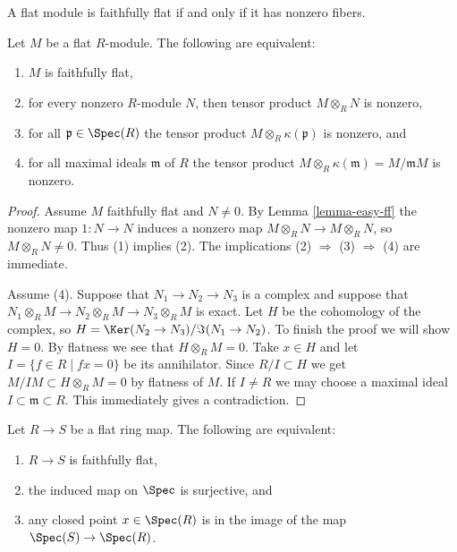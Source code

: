 \begin{lemma}
\label{lemma-ff}
\begin{slogan}
A flat module is faithfully flat if and only if it has nonzero fibers.
\end{slogan}
Let $M$ be a flat $R$-module.
The following are equivalent:
\begin{enumerate}
\item $M$ is faithfully flat,
\item for every nonzero $R$-module $N$, then tensor product $M \otimes_R N$
is nonzero,
\item for all $\mathfrak p \in \Spec(R)$
the tensor product $M \otimes_R \kappa(\mathfrak p)$ is nonzero, and
\item for all maximal ideals $\mathfrak m$ of $R$
the tensor product $M \otimes_R \kappa(\mathfrak m) = M/{\mathfrak m}M$
is nonzero.
\end{enumerate}
\end{lemma}

\begin{proof}
Assume $M$ faithfully flat and $N \not = 0$. By Lemma \ref{lemma-easy-ff}
the nonzero map $1 : N \to N$ induces a nonzero map
$M \otimes_R N \to M \otimes_R N$, so $M \otimes_R N \not = 0$.
Thus (1) implies (2). The implications (2) $\Rightarrow$ (3) $\Rightarrow$ (4)
are immediate.

\medskip\noindent
Assume (4). Suppose that $N_1 \to N_2 \to N_3$ is a complex and
suppose that $N_1 \otimes_R M \to N_2\otimes_R M \to
N_3\otimes_R M$ is exact. Let $H$ be the cohomology of the complex,
so $H = \Ker(N_2 \to N_3)/\Im(N_1 \to N_2)$. To finish the proof
we will show $H = 0$. By flatness we see that $H \otimes_R M = 0$.
Take $x \in H$ and let $I = \{f \in R \mid fx = 0 \}$
be its annihilator. Since $R/I \subset H$ we get
$M/IM \subset H \otimes_R M = 0$ by flatness of $M$.
If $I \not =  R$ we may choose
a maximal ideal $I \subset \mathfrak m \subset R$.
This immediately gives a contradiction.
\end{proof}

\begin{lemma}
\label{lemma-ff-rings}
Let $R \to S$ be a flat ring map.
The following are equivalent:
\begin{enumerate}
\item $R \to S$ is faithfully flat,
\item the induced map on $\Spec$ is surjective, and
\item any closed point $x \in \Spec(R)$ is
in the image of the map $\Spec(S) \to \Spec(R)$.
\end{enumerate}
\end{lemma}

